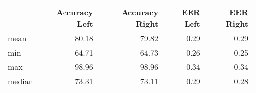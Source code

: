 \begin{tabular}{lrrrr}
\toprule
{} &  Accuracy Left &  Accuracy Right &  EER Left &  EER Right \\
\midrule
mean   &          80.18 &           79.82 &      0.29 &       0.29 \\
min    &          64.71 &           64.73 &      0.26 &       0.25 \\
max    &          98.96 &           98.96 &      0.34 &       0.34 \\
median &          73.31 &           73.11 &      0.29 &       0.28 \\
\bottomrule
\end{tabular}
